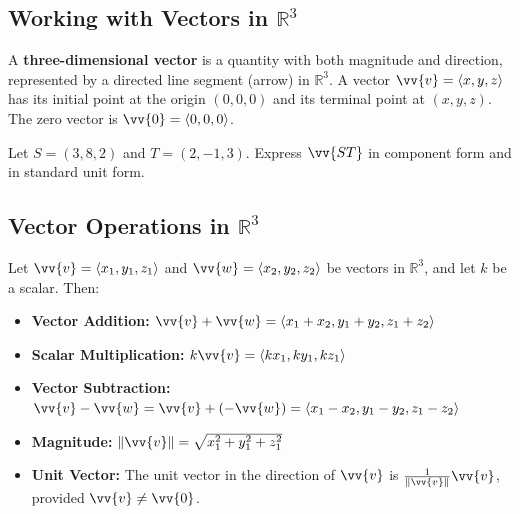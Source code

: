 \documentclass{article}
\begin{document}
\subsection*{Working with Vectors in \(\mathbb{R}^3\)}

A \textbf{three-dimensional vector} is a quantity with both magnitude and direction, represented by a directed line segment (arrow) in \(\mathbb{R}^3\). A vector \(\vv{v} = \langle x, y, z \rangle\) has its initial point at the origin \((0, 0, 0)\) and its terminal point at \((x, y, z)\). The zero vector is \(\vv{0} = \langle 0, 0, 0 \rangle\).

\begin{exercisebox}
    Let \(S = (3, 8, 2)\) and \(T = (2, -1, 3)\). Express \(\vv{ST}\) in component form and in standard unit form.
\end{exercisebox}

\subsection*{Vector Operations in \(\mathbb{R}^3\)}

\begin{definitionbox}
    Let \(\vv{v} = \langle x_1, y_1, z_1 \rangle\) and \(\vv{w} = \langle x_2, y_2, z_2 \rangle\) be vectors in \(\mathbb{R}^3\), and let \(k\) be a scalar. Then:
    \begin{itemize}
        \item \textbf{Vector Addition:} \(\vv{v} + \vv{w} = \langle x_1 + x_2, y_1 + y_2, z_1 + z_2 \rangle\)
        \item \textbf{Scalar Multiplication:} \(k\vv{v} = \langle kx_1, ky_1, kz_1 \rangle\)
        \item \textbf{Vector Subtraction:} \(\vv{v} - \vv{w} = \vv{v} + (-\vv{w}) = \langle x_1 - x_2, y_1 - y_2, z_1 - z_2 \rangle\)
        \item \textbf{Magnitude:} \(\|\vv{v}\| = \sqrt{x_1^2 + y_1^2 + z_1^2}\)
        \item \textbf{Unit Vector:} The unit vector in the direction of \(\vv{v}\) is \(\frac{1}{\|\vv{v}\|} \vv{v}\), provided \(\vv{v} \neq \vv{0}\).
    \end{itemize}
\end{definitionbox}
\end{document}
